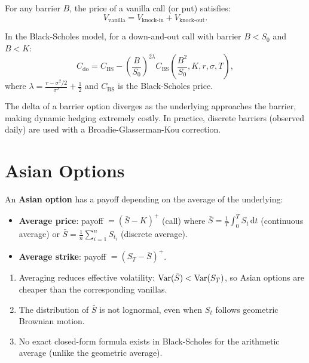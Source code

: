 \begin{theorem}
For any barrier $B$, the price of a vanilla call (or put) satisfies:
\[
    V_{\mathrm{vanilla}} = V_{\mathrm{knock\text{-}in}} + V_{\mathrm{knock\text{-}out}}.
\]
\end{theorem}

\begin{theorem}
In the Black-Scholes model, for a down-and-out call with barrier $B < S_0$
and $B < K$:
\[
    C_{\mathrm{do}} = C_{\mathrm{BS}} - \left(\frac{B}{S_0}\right)^{2\lambda}
    C_{\mathrm{BS}}\!\left(\frac{B^2}{S_0}, K, r, \sigma, T\right),
\]
where $\lambda = \frac{r - \sigma^2/2}{\sigma^2} + \frac{1}{2}$ and
$C_{\mathrm{BS}}$ is the Black-Scholes price.
\end{theorem}

\begin{attention}[title=\textbf{Hedging risk of barriers}]
The delta of a barrier option diverges as the underlying approaches the
barrier, making dynamic hedging extremely costly. In practice, discrete
barriers (observed daily) are used with a Broadie-Glasserman-Kou correction.
\end{attention}

\section{Asian Options}

\begin{definition}
An \textbf{Asian option} has a payoff depending on the average of the
underlying:
\begin{itemize}
    \item \textbf{Average price}: payoff $= (\bar{S} - K)^+$ (call) where
    $\bar{S} = \frac{1}{T}\int_0^T S_t\,\mathrm{d}t$ (continuous average) or
    $\bar{S} = \frac{1}{n}\sum_{i=1}^n S_{t_i}$ (discrete average).
    \item \textbf{Average strike}: payoff $= (S_T - \bar{S})^+$.
\end{itemize}
\end{definition}

\begin{proposition}
\begin{enumerate}
    \item Averaging reduces effective volatility:
    $\mathrm{Var}(\bar{S}) < \mathrm{Var}(S_T)$, so Asian options are cheaper than the
    corresponding vanillas.
    \item The distribution of $\bar{S}$ is not lognormal, even when $S_t$
    follows geometric Brownian motion.
    \item No exact closed-form formula exists in Black-Scholes for the
    arithmetic average (unlike the geometric average).
\end{enumerate}
\end{proposition}

